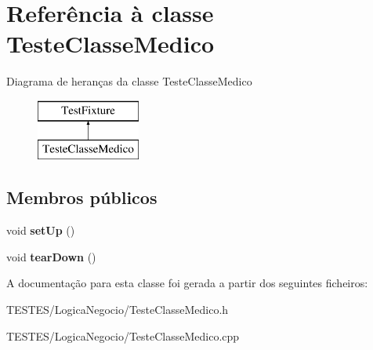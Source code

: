 \hypertarget{class_teste_classe_medico}{\section{Referência à classe Teste\-Classe\-Medico}
\label{class_teste_classe_medico}
}
Diagrama de heranças da classe Teste\-Classe\-Medico\begin{figure}[H]
\begin{center}
\leavevmode
\includegraphics[height=2.000000cm]{class_teste_classe_medico}
\end{center}
\end{figure}
\subsection*{Membros públicos}
\begin{DoxyCompactItemize}
\item 
\hypertarget{class_teste_classe_medico_a52c326ca6b97f683aaa237fa5460b925}{void {\bfseries set\-Up} ()}\label{class_teste_classe_medico_a52c326ca6b97f683aaa237fa5460b925}

\item 
\hypertarget{class_teste_classe_medico_aac9d992f872b19a70b61a4ff298a7cd9}{void {\bfseries tear\-Down} ()}\label{class_teste_classe_medico_aac9d992f872b19a70b61a4ff298a7cd9}

\end{DoxyCompactItemize}


A documentação para esta classe foi gerada a partir dos seguintes ficheiros\-:\begin{DoxyCompactItemize}
\item 
T\-E\-S\-T\-E\-S/\-Logica\-Negocio/Teste\-Classe\-Medico.\-h\item 
T\-E\-S\-T\-E\-S/\-Logica\-Negocio/Teste\-Classe\-Medico.\-cpp\end{DoxyCompactItemize}
